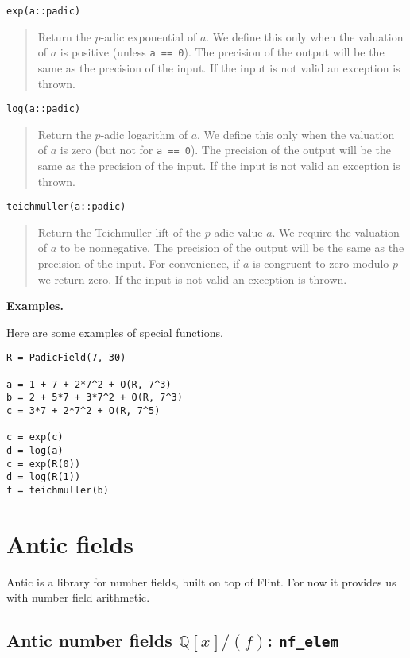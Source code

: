 \documentclass[a4paper,10pt]{article}
\newcommand{\Q}{\mathbb{Q}}
\newcommand{\code}{\lstinline}
\newcommand{\desc}[1]{\vspace{-3mm}\begin{quote}#1\end{quote}}
\begin{document}
{{\begin{lstlisting}
exp(a::padic)
\end{lstlisting}

\desc{Return the $p$-adic exponential of $a$. We define this only when the
valuation of $a$ is positive (unless \code{a == 0}). The precision of the
output will be the same as the precision of the input. If the input is not
valid an exception is thrown.}

\begin{lstlisting}
log(a::padic)
\end{lstlisting}

\desc{Return the $p$-adic logarithm of $a$. We define this only when the
valuation of $a$ is zero (but not for \code{a == 0}). The precision of the
output will be the same as the precision of the input. If the input is not
valid an exception is thrown.}

\begin{lstlisting}
teichmuller(a::padic)
\end{lstlisting}

\desc{Return the Teichmuller lift of the $p$-adic value $a$. We require the
valuation of $a$ to be nonnegative. The precision of the output will be the
same as the precision of the input. For convenience, if $a$ is congruent to
zero modulo $p$ we return zero. If the input is not valid an exception is
thrown.}

\textbf{Examples.}

Here are some examples of special functions.

\begin{lstlisting}
R = PadicField(7, 30)

a = 1 + 7 + 2*7^2 + O(R, 7^3)
b = 2 + 5*7 + 3*7^2 + O(R, 7^3)
c = 3*7 + 2*7^2 + O(R, 7^5)

c = exp(c)
d = log(a)
c = exp(R(0))
d = log(R(1))
f = teichmuller(b) 
\end{lstlisting}

\section{Antic fields}

Antic is a library for number fields, built on top of Flint. For now it provides us
with number field arithmetic.

\subsection{Antic number fields $\Q[x]/(f)$: \code|nf_elem|}

}}
\end{document}
